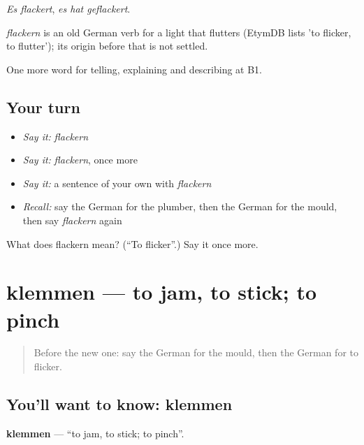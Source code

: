 \emph{Es flackert}, \emph{es hat geflackert}.

\begin{cousinweb}
\emph{flackern} is an old German verb for a light that flutters (EtymDB lists 'to flicker, to flutter'); its origin before that is not settled.
\end{cousinweb}

\begin{grammarlens}[title={What you've built}]
One more word for telling, explaining and describing at B1.
\end{grammarlens}

\subsection*{Your turn}
\begin{itemize}
\raggedright
  \item \emph{Say it:} \emph{flackern}
  \item \emph{Say it:} \emph{flackern}, once more
  \item \emph{Say it:} a sentence of your own with \emph{flackern}
  \item \emph{Recall:} say the German for the plumber, then the German for the mould, then say \emph{flackern} again
\end{itemize}

\begin{tcolorbox}[breakable,colback=teal!4,colframe=teal!35!black,title={Before you move on}]
What does flackern mean? (\textquotedblleft{}To flicker\textquotedblright{}.) Say it once more.
\end{tcolorbox}
\section[klemmen]{klemmen — to jam, to stick; to pinch}

\label{lesson:GE-C429-klemmen}



\begin{quote}
Before the new one: say the German for the mould, then the German for to flicker.
\end{quote}

\subsection*{You'll want to know: klemmen}
\textbf{klemmen} — \textquotedblleft{}to jam, to stick; to pinch\textquotedblright{}.

